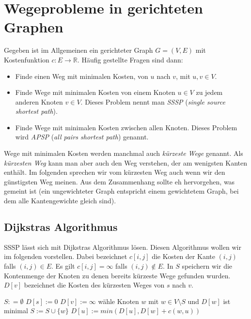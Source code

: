 \section{Wegeprobleme in gerichteten Graphen}
Gegeben ist im Allgemeinen ein gerichteter Graph $G=(V, E)$ mit Kostenfunktion $c : E \to \mathbb{R}$. Häufig gestellte Fragen sind dann:

\begin{itemize}\renewcommand{\labelenumi}{\alph{enumi})}
  \item Finde einen Weg mit minimalen Kosten, von $u$ nach $v$, mit $u,v \in V$.
  \item Finde Wege mit minimalen Kosten von einem Knoten $u \in V$ zu jedem anderen Knoten $v \in V$. Dieses Problem nennt man \textit{SSSP} (\textit{single source shortest path}).
  \item Finde Wege mit minimalen Kosten zwischen allen Knoten. Dieses Problem wird \textit{APSP} (\textit{all pairs shortest path}) genannt.
\end{itemize}

Wege mit minimalen Kosten werden manchmal auch \textit{kürzeste Wege} genannt. Als \textit{kürzesten Weg} kann man aber auch den Weg verstehen, der am wenigsten Kanten enthält. Im folgenden sprechen wir vom kürzesten Weg auch wenn wir den günstigsten Weg meinen. Aus dem Zusammenhang sollte eh hervorgehen, was gemeint ist (ein ungewichteter Graph entspricht einem gewichtetem Graph, bei dem alle Kantengewichte gleich sind).

\subsection{Dijkstras Algorithmus}
SSSP lässt sich mit Dijkstras Algorithmus lösen. Diesen Algorithmus wollen wir im folgenden vorstellen. Dabei bezeichnet $c[i,j]$ die Kosten der Kante $(i,j)$ falls $(i,j) \in E$. Es gilt $c[i,j] = \infty$ falls $(i,j) \notin E$. In $S$ speichern wir die Kontenmenge der Knoten zu denen bereits kürzeste Wege gefunden wurden. $D[v]$ bezeichnet die Kosten des kürzesten Weges von $s$ nach $v$.

\begin{Alg}[Dijkstra"=Algorithmus]
\begin{algorithmic}[1]
  \State $S :	= \emptyset$
  \State $D[s] := 0$
    \State $D[v] := \infty$
  \EndFor
    \State wähle Knoten $w$ mit $w \in V \setminus S$ und $D[w]$ ist minimal
    \State $S := S \cup \{ w \}$
      \State $D[u] := min(D[u], D[w] + c(w,u))$
    \EndFor
  \EndWhile
\end{algorithmic}
\end{Alg}

